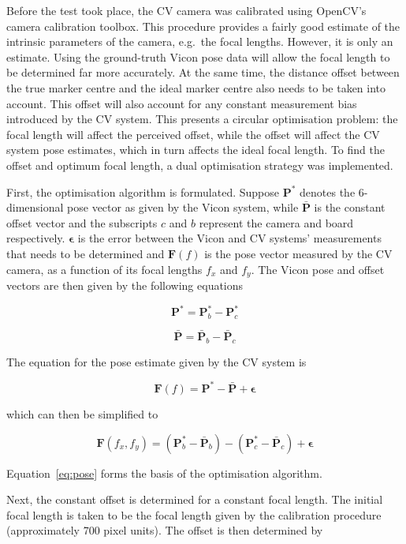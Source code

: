 Before the test took place, the CV camera was calibrated using OpenCV's camera calibration toolbox. This procedure provides a fairly good estimate of the intrinsic parameters of the camera, e.g.\ the focal lengths. However, it is only an estimate. Using the ground-truth Vicon pose data will allow the focal length to be determined far more accurately. At the same time, the distance offset between the true marker centre and the ideal marker centre also needs to be taken into account. This offset will also account for any constant measurement bias introduced by the CV system. This presents a circular optimisation problem: the focal length will affect the perceived offset, while the offset will affect the CV system pose estimates, which in turn affects the ideal focal length. To find the offset and optimum focal length, a dual optimisation strategy was implemented.  

First, the optimisation algorithm is formulated. Suppose $\bm{P}^*$ denotes the 6-dimensional pose vector as given by the Vicon system, while $\bar{\bm{P}}$ is the constant offset vector and the subscripts $c$ and $b$ represent the camera and board respectively. $\bm{\epsilon}$ is the error between the Vicon and CV systems' measurements that needs to be determined and $\bm{F}(f)$ is the pose vector measured by the CV camera, as a function of its focal lengths $f_x$ and $f_y$. The Vicon pose and offset vectors are then given by the following equations

\[
  \bm{P}^* = \bm{P}^*_b - \bm{P}^*_c
\]

\[
  \bar{\bm{P}} = \bar{\bm{P}}_b - \bar{\bm{P}}_c
\]

The equation for the pose estimate given by the CV system is 

\[
  \bm{F}(f) = \bm{P}^* - \bar{\bm{P}} + \bm{\epsilon}
\]

which can then be simplified to 

\begin{equation}
  \label{eq:pose}
  \bm{F}(f_x, f_y) = (\bm{P}^*_b - \bar{\bm{P}}_b) - (\bm{P}^*_c - \bar{\bm{P}}_c) + \bm{\epsilon}
\end{equation}

Equation~\ref{eq:pose} forms the basis of the optimisation algorithm.

Next, the constant offset is determined for a constant focal length. The initial focal length is taken to be the focal length given by the calibration procedure (approximately 700 pixel units). The offset is then determined by 

